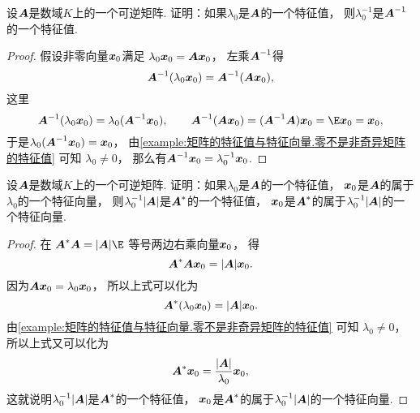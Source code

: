 \begin{example}\label{example:矩阵的特征值与特征向量.矩阵的多项式的特征值3}
设\(\boldsymbol{A}\)是数域\(K\)上的一个可逆矩阵.
证明：如果\(\lambda_0\)是\(\boldsymbol{A}\)的一个特征值，
则\(\lambda_0^{-1}\)是\(\boldsymbol{A}^{-1}\)的一个特征值.
\begin{proof}
假设非零向量\(\boldsymbol{x}_0\)满足
\(\lambda_0 \boldsymbol{x}_0 = \boldsymbol{A} \boldsymbol{x}_0\)，
左乘\(\boldsymbol{A}^{-1}\)得\begin{equation*}
	\boldsymbol{A}^{-1} (\lambda_0 \boldsymbol{x}_0)
	= \boldsymbol{A}^{-1} (\boldsymbol{A} \boldsymbol{x}_0),
\end{equation*}
这里\begin{equation*}
	\vb{A}^{-1} (\lambda_0 \vb{x}_0)
	= \lambda_0 (\vb{A}^{-1} \vb{x}_0),
	\qquad
	\vb{A}^{-1} (\vb{A} \vb{x}_0)
	= (\vb{A}^{-1} \vb{A}) \vb{x}_0
	= \E \vb{x}_0
	= \vb{x}_0,
\end{equation*}
于是\(\lambda_0 (\boldsymbol{A}^{-1} \boldsymbol{x}_0) = \boldsymbol{x}_0\)，
由\cref{example:矩阵的特征值与特征向量.零不是非奇异矩阵的特征值} 可知
\(\lambda_0 \neq 0\)，
那么有\(\boldsymbol{A}^{-1} \boldsymbol{x}_0 = \lambda_0^{-1} \boldsymbol{x}_0\).
\end{proof}
\end{example}
\begin{example}\label{example:矩阵的特征值与特征向量.伴随矩阵的特征值}
设\(\boldsymbol{A}\)是数域\(K\)上的一个可逆矩阵.
证明：如果\(\lambda_0\)是\(\boldsymbol{A}\)的一个特征值，
\(\boldsymbol{x}_0\)是\(\boldsymbol{A}\)的属于\(\lambda_0\)的一个特征向量，
则\(\lambda_0^{-1} \abs{\boldsymbol{A}}\)是\(\boldsymbol{A}^*\)的一个特征值，
\(\boldsymbol{x}_0\)是\(\boldsymbol{A}^*\)的属于\(\lambda_0^{-1} \abs{\boldsymbol{A}}\)的一个特征向量.
\begin{proof}
在 \hyperref[equation:行列式.伴随矩阵.恒等式1]{\(\vb{A}^* \vb{A} = \abs{\vb{A}} \E\)}
等号两边右乘向量\(\boldsymbol{x}_0\)，
得\begin{equation*}
	\boldsymbol{A}^* \boldsymbol{A} \boldsymbol{x}_0
	= \abs{\boldsymbol{A}} \boldsymbol{x}_0.
\end{equation*}
因为\(\boldsymbol{A} \boldsymbol{x}_0 = \lambda_0 \boldsymbol{x}_0\)，
所以上式可以化为\begin{equation*}
	\boldsymbol{A}^* (\lambda_0 \boldsymbol{x}_0)
	= \abs{\boldsymbol{A}} \boldsymbol{x}_0.
\end{equation*}
由\cref{example:矩阵的特征值与特征向量.零不是非奇异矩阵的特征值} 可知
\(\lambda_0 \neq 0\)，
所以上式又可以化为\begin{equation*}
	\boldsymbol{A}^* \boldsymbol{x}_0
	= \frac{\abs{\boldsymbol{A}}}{\lambda_0} \boldsymbol{x}_0,
\end{equation*}
这就说明\(\lambda_0^{-1} \abs{\boldsymbol{A}}\)是\(\boldsymbol{A}^*\)的一个特征值，
\(\boldsymbol{x}_0\)是\(\boldsymbol{A}^*\)的属于\(\lambda_0^{-1} \abs{\boldsymbol{A}}\)的一个特征向量.
\end{proof}
\end{example}
